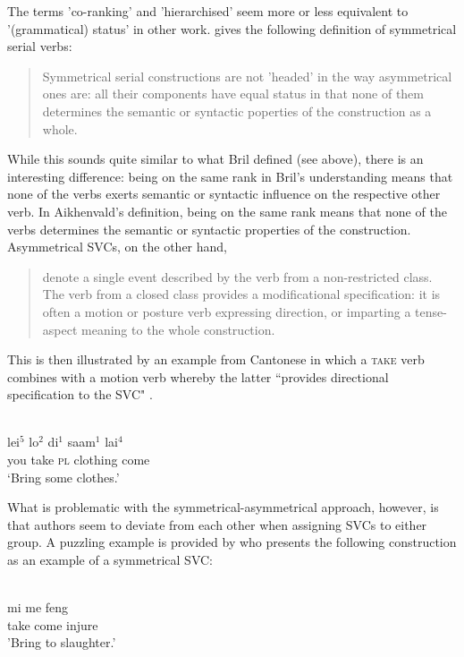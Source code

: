 The terms 'co-ranking' and 'hierarchised' seem more or less equivalent to '(grammatical) status' in other work. \citet[22]{Aikhenvald2006} gives the following definition of symmetrical serial verbs:

\begin{quote}Symmetrical serial constructions are not 'headed' in the way asymmetrical ones are: all their components have equal status in that none of them determines the semantic or syntactic poperties of the construction as a whole.\end{quote}

While this sounds quite similar to what Bril defined (see above), there is an interesting difference: being on the same rank in Bril's understanding means that none of the verbs exerts semantic or syntactic influence on the respective other verb. In Aikhenvald's definition, being on the same rank means that none of the verbs determines the semantic or syntactic properties of the construction. Asymmetrical SVCs, on the other hand, 

\begin{quote}denote a single event described by the verb from a non-restricted class. The verb from a closed class provides a modificational specification: it is often a motion or posture verb expressing direction, or imparting a tense-aspect meaning to the whole construction.\end{quote}

This is then illustrated by an example from Cantonese in which a \textsc{take} verb combines with a motion verb whereby the latter ``provides directional specification to the SVC" \citep[22]{Aikhenvald2006}.

\ea \label{}
\\
\gll lei$^5$ lo$^2$ di$^1$ saam$^1$ lai$^4$ \\
you take \textsc{pl} clothing come \\
\glft `Bring some clothes.'\\ 
\z

What is problematic with the symmetrical-asymmetrical approach, however, is that authors seem to deviate from each other when assigning SVCs to either group. A puzzling example is provided by \citet{kratochvil2007grammar} who presents the following construction as an example of a symmetrical SVC:

\ea \label{}
\\
\gll mi me feng \\
 take come injure \\
\glft 'Bring to slaughter.' \\ 
\z

